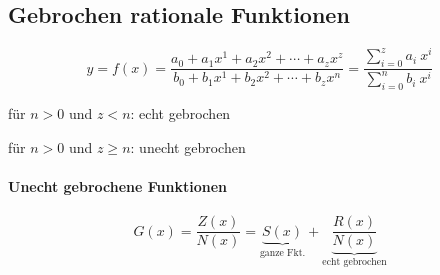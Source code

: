 \subsection{Gebrochen rationale Funktionen}

\[
    y = f(x) = \frac{a_0 + a_1 x^1 + a_2 x^2 + \cdots + a_z x^z}
    {b_0 + b_1 x^1 + b_2 x^2 + \cdots + b_z x^n}
    = \frac{\sum_{i=0}^{z} a_i\ x^i}{\sum_{i=0}^{n} b_i\ x^i}
\]

für \(n > 0\) und \(z < n\): echt gebrochen

für \(n > 0\) und \(z \geq n\): unecht gebrochen

\paragraph{Unecht gebrochene Funktionen}

\[
    G(x) = \frac{Z(x)}{N(x)} = \underbrace{S(x)}_{\text{ganze Fkt.}} + \underbrace{\frac{R(x)}{N(x)}}_{\text{echt gebrochen}}
\]







